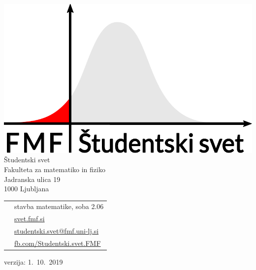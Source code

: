 \documentclass[a4paper,notumble]{leaflet} %
\begin{document}
  \newpage
  \newpage
  {\Large
    
    \includegraphics[width=0.6\linewidth]{ssfmf_logo_col.pdf} \\[1cm]
    
    Študentski svet \\
    Fakulteta za matematiko in fiziko \\
    Jadranska ulica 19 \\
    1000 Ljubljana \\[1cm]
    
    \begin{tabular}{cl}
      \faBuilding{} & stavba matematike, soba 2.06 \\[0.3cm]
      \faGlobe{} & \url{svet.fmf.si} \\[0.3cm]
      \faEnvelopeSquare{} & \url{studentski.svet@fmf.uni-lj.si} \\[0.3cm]
      \faFacebookSquare{} & \url{fb.com/Studentski.svet.FMF}
    \end{tabular}
    
  }
  
  \vfill
  verzija: 1.~10.~2019
\end{document}

